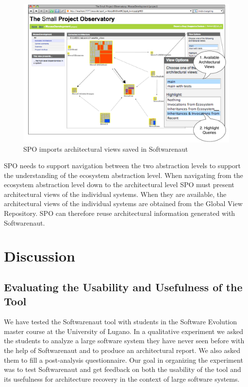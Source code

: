 \documentclass[preprint,12pt]{elsarticle}
\begin{document}
\begin{figure}[th!]
\begin{center}
\includegraphics[width=0.7\linewidth]{images/SpoArchitectural}
\caption{SPO imports architectural views saved in Softwarenaut}
\label{}
\end{center}
\end{figure}


SPO needs to support navigation between the two abstraction levels to support the understanding of  the ecosystem abstraction level. When navigating from the ecosystem abstraction level down to the architectural level SPO must present architectural views of the individual systems. When they are available, the architectural views of the individual systems are obtained from the Global View Repository. SPO can therefore reuse architectural information generated with Softwarenaut.




\newpage
\section {Discussion}
\label {sec:disc}

\subsection {Evaluating the Usability and Usefulness of the Tool}
We have tested the Softwarenaut tool with students in the Software Evolution master course at the University of Lugano. In a qualitative experiment we asked the students to analyze a large software system they have never seen before with the help of Softwarenaut and to produce an architectural report. We also asked them to fill a post-analysis questionnaire. Our goal in organizing the experiment was to test Softwarenaut and get feedback on both the usability of the tool and its usefulness for architecture recovery in the context of large software systems. 
\end{document}
